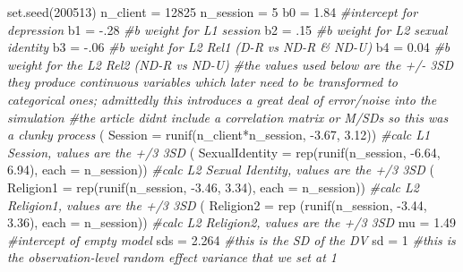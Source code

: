 \documentclass[
  english,
]{book}
\newenvironment{Shaded}{\begin{snugshade}}{\end{snugshade}}
\newcommand{\AttributeTok}[1]{\textcolor[rgb]{0.77,0.63,0.00}{#1}}
\newcommand{\CommentTok}[1]{\textcolor[rgb]{0.56,0.35,0.01}{\textit{#1}}}
\newcommand{\DecValTok}[1]{\textcolor[rgb]{0.00,0.00,0.81}{#1}}
\newcommand{\FloatTok}[1]{\textcolor[rgb]{0.00,0.00,0.81}{#1}}
\newcommand{\FunctionTok}[1]{\textcolor[rgb]{0.00,0.00,0.00}{#1}}
\newcommand{\NormalTok}[1]{#1}
\newcommand{\OtherTok}[1]{\textcolor[rgb]{0.56,0.35,0.01}{#1}}
\newcommand{\SpecialCharTok}[1]{\textcolor[rgb]{0.00,0.00,0.00}{#1}}
\begin{document}
\begin{Shaded}
\begin{Highlighting}[]
\FunctionTok{set.seed}\NormalTok{(}\DecValTok{200513}\NormalTok{)}
\NormalTok{n\_client }\OtherTok{=} \DecValTok{12825}
\NormalTok{n\_session }\OtherTok{=} \DecValTok{5}
\NormalTok{b0 }\OtherTok{=} \FloatTok{1.84} \CommentTok{\#intercept for depression}
\NormalTok{b1 }\OtherTok{=} \SpecialCharTok{{-}}\NormalTok{.}\DecValTok{28} \CommentTok{\#b weight for L1 session}
\NormalTok{b2 }\OtherTok{=}\NormalTok{ .}\DecValTok{15} \CommentTok{\#b weight for L2 sexual identity}
\NormalTok{b3 }\OtherTok{=}  \SpecialCharTok{{-}}\NormalTok{.}\DecValTok{06} \CommentTok{\#b weight for L2 Rel1 (D{-}R vs ND{-}R \& ND{-}U)}
\NormalTok{b4 }\OtherTok{=} \FloatTok{0.04} \CommentTok{\#b weight for the L2 Rel2 (ND{-}R vs ND{-}U)}
\CommentTok{\#the values used below are the +/{-} 3SD they produce continuous variables which later need to be transformed to categorical ones; admittedly this introduces a great deal of error/noise into the simulation}
\CommentTok{\#the article didn\textquotesingle{}t include a correlation matrix or M/SDs so this was a clunky process }
\NormalTok{( }\AttributeTok{Session =} \FunctionTok{runif}\NormalTok{(n\_client}\SpecialCharTok{*}\NormalTok{n\_session, }\SpecialCharTok{{-}}\FloatTok{3.67}\NormalTok{, }\FloatTok{3.12}\NormalTok{)) }\CommentTok{\#calc L1 Session, values are the +/3 3SD}
\NormalTok{( }\AttributeTok{SexualIdentity =} \FunctionTok{rep}\NormalTok{(}\FunctionTok{runif}\NormalTok{(n\_session, }\SpecialCharTok{{-}}\FloatTok{6.64}\NormalTok{, }\FloatTok{6.94}\NormalTok{), }\AttributeTok{each =}\NormalTok{ n\_session)) }\CommentTok{\#calc L2 Sexual Identity, values are the +/3 3SD}
\NormalTok{( }\AttributeTok{Religion1 =} \FunctionTok{rep}\NormalTok{(}\FunctionTok{runif}\NormalTok{(n\_session, }\SpecialCharTok{{-}}\FloatTok{3.46}\NormalTok{, }\FloatTok{3.34}\NormalTok{), }\AttributeTok{each =}\NormalTok{ n\_session)) }\CommentTok{\#calc L2 Religion1, values are the +/3 3SD}
\NormalTok{( }\AttributeTok{Religion2 =} \FunctionTok{rep}\NormalTok{ (}\FunctionTok{runif}\NormalTok{(n\_session, }\SpecialCharTok{{-}}\FloatTok{3.44}\NormalTok{, }\FloatTok{3.36}\NormalTok{), }\AttributeTok{each =}\NormalTok{ n\_session)) }\CommentTok{\#calc L2 Religion2, values are the +/3 3SD}
\NormalTok{mu }\OtherTok{=} \FloatTok{1.49} \CommentTok{\#intercept of empty model }
\NormalTok{sds }\OtherTok{=} \FloatTok{2.264} \CommentTok{\#this is the SD of the DV}
\NormalTok{sd }\OtherTok{=} \DecValTok{1} \CommentTok{\#this is the observation{-}level random effect variance that we set at 1}


\end{Highlighting}
\end{Shaded}
\end{document}
